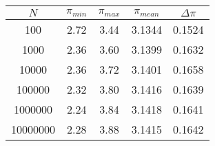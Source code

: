 \documentclass[fontsize=12pt, usenames, dvipsnames, headinclude, headsepline, footinclude, footsepline]{scrartcl}
\begin{document}
\begin{exo}
\begin{enumerate}
    \begin{sol}\hfill\\
      \begin{center}
        \begin{tabular}{|c|c|c|c|c|}
          \hline
          $N$      &  $\pi_{min}$  &  $\pi_{max}$  &  $\pi_{mean}$ &  $\Delta \pi$  \\\hline
          100      &    2.72      &     3.44     &    3.1344    &   0.1524        \\\hline
          1000     &    2.36      &     3.60     &    3.1399    &   0.1632        \\\hline
          10000    &    2.36      &     3.72     &    3.1401    &   0.1658        \\\hline
          100000   &    2.32      &     3.80     &    3.1416    &   0.1639        \\\hline
          1000000  &    2.24      &     3.84     &    3.1418    &   0.1641        \\\hline
          10000000 &    2.28      &     3.88     &    3.1415    &   0.1642        \\\hline
        \end{tabular}
      \end{center}

    \end{sol}

  \end{enumerate}
\end{exo}
\end{document}
